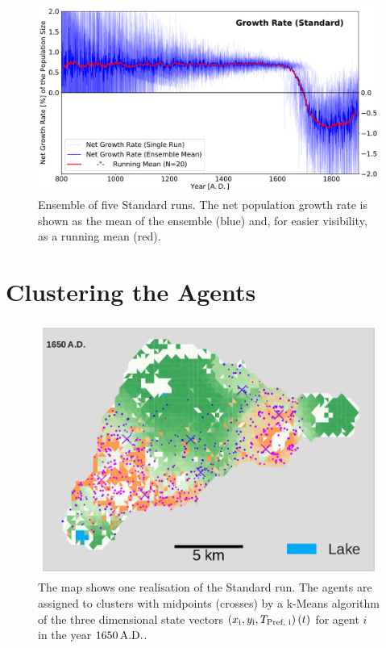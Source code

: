 \begin{figure}[h]
	\centering
	\includegraphics[width=1.0\linewidth]{images/Results/Standard/NetGrowthRate}
	\caption{Ensemble of five Standard runs. The net population growth rate is shown as the mean of the ensemble (blue) and, for easier visibility, as a running mean (red).} 
	\label{fig:app:STDnetgrowthrate}
\end{figure}
\FloatBarrier
\section{Clustering the Agents}
\begin{figure}[h]
	\centering
	\includegraphics[width=1\linewidth]{images/ClusterSTDS1650}
	\caption{The map shows one realisation of the Standard run. The agents are assigned to clusters with midpoints (crosses) by a k-Means algorithm of the three dimensional state vectors $\left( x_{\rm i}, y_{\rm i}, T_\text{Pref, i} \right)(t)$ for agent $i$ in the year $1650\, {\rm A.D.}$.}
	\label{fig:clusterstds1650}
\end{figure}


